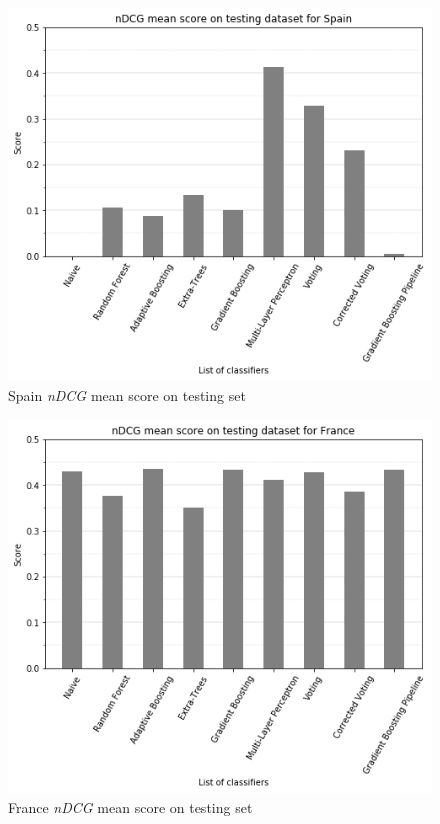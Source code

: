 \documentclass[twocolumn, switch]{article}
\begin{document}
\begin{figure}[H]
\centering
\includegraphics[scale=0.35]{../graphs/ndcg_mean_score_es_test}
\caption{Spain \textit{nDCG} mean score on testing set}
\label{fig:ndcgtestes}
\end{figure}

\begin{figure}[H]
\centering
\includegraphics[scale=0.35]{../graphs/ndcg_mean_score_fr_test}
\caption{France \textit{nDCG} mean score on testing set}
\label{fig:ndcgtestfr}
\end{figure}
\end{document}
